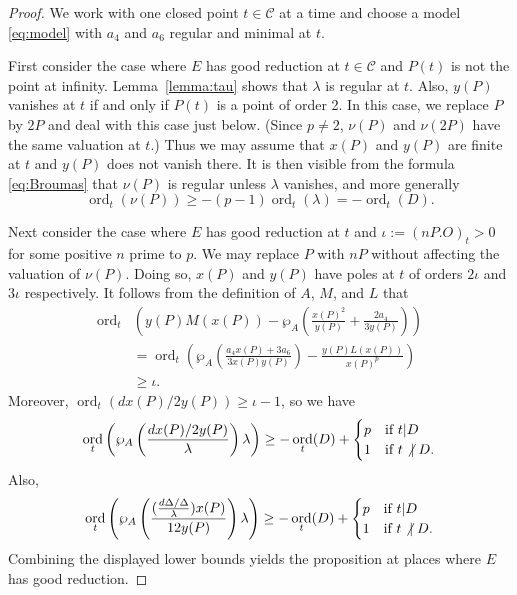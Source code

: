 \documentclass[12pt,reqno]{amsart}
\numberwithin{equation}{section}
\theoremstyle{plain}
\theoremstyle{definition}
\theoremstyle{remark}
\newcommand{\CC}{\mathcal{C}}
\newcommand{\<}{\langle}
\renewcommand{\>}{\rangle}
\newcommand{\nodiv}{\not|}
\def\nodiv{\mathrel{\mathchoice{\not|}{\not|}{\kern-.2em\not\kern.2em|}
{\kern-.2em\not\kern.2em|}}}
\DeclareMathOperator{\ord}{ord}
\numberwithin{equation}{section}
\begin{document}
\begin{proof}
  We work with one closed point $t\in\CC$ at a time and choose a model
  \eqref{eq:model} with $a_4$ and $a_6$ regular and minimal at $t$.

  First consider the case where $E$ has good reduction at $t\in \CC$
  and $P(t)$ is not the point at infinity.  Lemma~\ref{lemma:tau}
  shows that $\lambda$ is regular at $t$.  Also, $y(P)$ vanishes at $t$
  if and only if $P(t)$ is a point of order 2.  In this case, we
  replace $P$ by $2P$ and deal with this case just below.  (Since
  $p\neq2$, $\nu(P)$ and $\nu(2P)$ have the same valuation at $t$.)
  Thus we may assume that $x(P)$ and $y(P)$ are finite at $t$ and
  $y(P)$ does not vanish there.  It is then visible from the formula
  \eqref{eq:Broumas} that $\nu(P)$ is regular unless $\lambda$ vanishes,
  and more generally
  \[\ord_t(\nu(P))\ge-(p-1)\ord_t(\lambda)=-\ord_t(D).\]

  Next consider the case where $E$ has good reduction at $t$ and
  $\iota:=(nP.O)_t>0$ for some positive $n$ prime to $p$.  We may
  replace $P$ with $nP$ without affecting the valuation of $\nu(P)$.
  Doing so, $x(P)$ and $y(P)$ have poles at $t$ of orders $2\iota$ and
  $3\iota$ respectively.
  It follows from the definition of $A$, $M$, and $L$ that
  \begin{align*}
    \ord_t&\left(y(P)M(x(P))-\wp_A\left(\frac{x(P)^2}{y(P)}
            +\frac{2a_4}{3y(P)}\right)\right)\\
    &=\ord_t\left(\wp_A\left(\frac{a_4x(P)+3a_6}{3x(P)y(P)}\right)
            -\frac{y(P)L(x(P))}{x(P)^p}\right)\\
    &\ge\iota.    
  \end{align*}
Moreover,
  $\ord_t(dx(P)/2y(P))\ge\iota-1$, so we have
  \[\ord_t\left(\wp_A\left(\frac{dx(P)/2y(P)}{\lambda}\right)\lambda\right)
    \ge -\ord_t(D)+
    \begin{cases}
      p&\text{if $t|D$}\\
      1&\text{if $t\nodiv D$}.
    \end{cases}\]
Also,
\[\ord_t\left(\wp_A\left(\frac{(\frac{d\Delta/\Delta}{\lambda})x(P)}
      {12y(P)}\right)\lambda\right)
      \ge -\ord_t(D)+
    \begin{cases}
      p&\text{if $t|D$}\\
      1&\text{if $t\nodiv D$}.
    \end{cases}\]
Combining the displayed lower bounds yields the
  proposition at places where $E$ has good reduction.


\end{proof}
\end{document}
